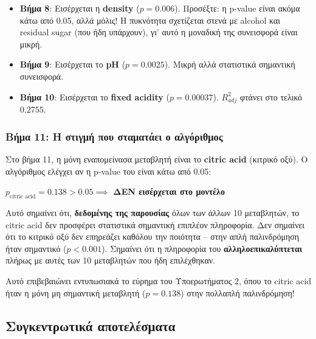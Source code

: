 \documentclass[12pt,a4paper]{article}
\begin{document}
\begin{itemize}
    \item \textbf{Βήμα 8}: Εισέρχεται η \textbf{density} ($p = 0.006$). Προσέξτε: η p-value είναι ακόμα κάτω από 0.05, αλλά μόλις! Η πυκνότητα σχετίζεται στενά με alcohol και residual sugar (που ήδη υπάρχουν), γι' αυτό η μοναδική της συνεισφορά είναι μικρή.

    \item \textbf{Βήμα 9}: Εισέρχεται το \textbf{pH} ($p = 0.0025$). Μικρή αλλά στατιστικά σημαντική συνεισφορά.

    \item \textbf{Βήμα 10}: Εισέρχεται το \textbf{fixed acidity} ($p = 0.00037$). $R^2_{adj}$ φτάνει στο τελικό $0.2755$.
\end{itemize}

\subsubsection{Βήμα 11: Η στιγμή που σταματάει ο αλγόριθμος}

\begin{warningbox}
Στο βήμα 11, η μόνη εναπομείνασα μεταβλητή είναι το \textbf{citric acid} (κιτρικό οξύ). Ο αλγόριθμος ελέγχει αν η p-value του είναι κάτω από 0.05:

$p_{\text{citric acid}} = 0.138 > 0.05 \implies$ \textbf{ΔΕΝ εισέρχεται στο μοντέλο}

Αυτό σημαίνει ότι, \textbf{δεδομένης της παρουσίας} όλων των άλλων 10 μεταβλητών, το citric acid δεν προσφέρει στατιστικά σημαντική επιπλέον πληροφορία. Δεν σημαίνει ότι το κιτρικό οξύ δεν επηρεάζει καθόλου την ποιότητα -- στην απλή παλινδρόμηση ήταν σημαντικό ($p < 0.001$). Σημαίνει ότι η πληροφορία του \textbf{αλληλοεπικαλύπτεται} πλήρως με αυτές των 10 μεταβλητών που ήδη επιλέχθηκαν.

Αυτό επιβεβαιώνει εντυπωσιακά το εύρημα του Υποερωτήματος 2, όπου το citric acid ήταν η μόνη μη σημαντική μεταβλητή ($p = 0.138$) στην πολλαπλή παλινδρόμηση!
\end{warningbox}

\subsection{Συγκεντρωτικά αποτελέσματα}
\end{document}
